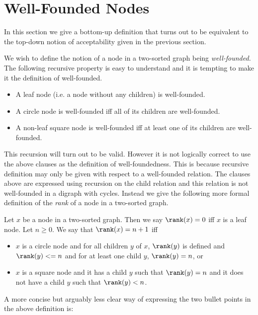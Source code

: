 \documentclass[oneside,12pt]{amsart}
\begin{document}
\section{Well-Founded Nodes}

In this section we give a bottom-up definition that turns out to be equivalent to the top-down
notion of acceptability given in the previous section.

We wish to define the notion of a node in a two-sorted graph being \emph{well-founded.} The following recursive property
is easy to understand and it is tempting to make it the definition of well-founded.

\begin{itemize}
\item A leaf node (i.e. a node without any children) is well-founded.
\item A circle node is well-founded iff all of its children are well-founded.
\item A non-leaf square node is well-founded iff at least one of its children are well-founded.
\end{itemize}

This recursion will turn out to be valid. However it is not logically correct to use the above clauses as the
definition of well-foundedness. This is because recursive definition may only be given with respect to
a well-founded relation. The clauses above are expressed using recursion on the child relation and this
relation is not well-founded in a digraph with cycles. Instead we give the following more formal definition
of the \emph{rank} of a node in a two-sorted graph.

\begin{definition}
Let $x$ be a node in a two-sorted graph. Then we say $\rank(x) = 0$ iff $x$ is a leaf node.
Let $n\geq 0$. We say that $\rank(x) = n+1$ iff
\begin{itemize}
\item $x$ is a circle node and for all children $y$ of $x$, $\rank(y)$ is defined and $\rank(y) <= n$ and for at least one child
$y$, $\rank(y)=n$, or
\item $x$ is a square node and it has a child $y$ such that $\rank(y) = n$ and it does not have a child
$y$ such that $\rank(y) < n$.
\end{itemize}
\end{definition}

A more concise but arguably less clear way of expressing the two bullet points in the above definition is:
\end{document}
